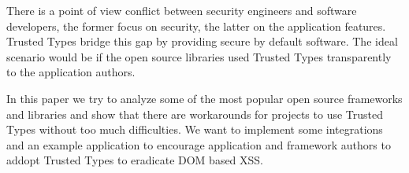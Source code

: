 There is a point of view conflict between security engineers and software developers, the former
focus on security, the latter on the application features. Trusted Types bridge this gap by
providing secure by default software. The ideal scenario would be if the open source libraries used
Trusted Types transparently to the application authors.

In this paper we try to analyze some of the most popular open source frameworks and libraries and
show that there are workarounds for projects to use Trusted Types without too much difficulties. We
want to implement some integrations and an example application to encourage application and
framework authors to addopt Trusted Types to eradicate DOM based XSS.

